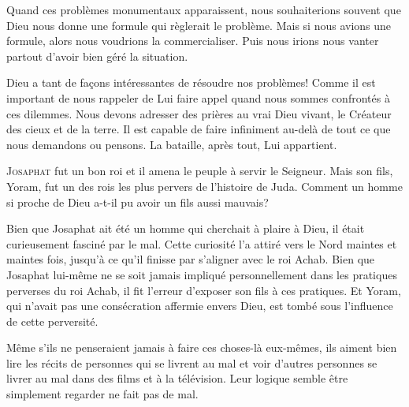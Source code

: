 Quand ces problèmes monumentaux apparaissent, nous souhaiterions souvent
 que Dieu nous donne une formule qui règlerait le problème.
 Mais si nous avions une formule, alors nous voudrions la commercialiser.
 Puis nous irions nous vanter partout d'avoir bien géré la situation. 

Dieu a tant de fa\c{c}ons intéressantes de résoudre nos problèmes!
 Comme il est important de nous rappeler de Lui faire appel quand nous sommes
 confrontés à ces dilemmes. Nous devons adresser des prières
 au vrai Dieu vivant, le Créateur des cieux et de la terre.
 Il est capable de faire infiniment au-delà de tout ce que nous demandons
 ou pensons. La bataille, après tout, Lui appartient. 

\dvrule






\lettrine{J}{osaphat} fut un bon roi et il amena le peuple
 à servir le Seigneur. Mais son fils, Yoram, fut un des rois
 les plus pervers de l'histoire de Juda.
 Comment un homme si proche de Dieu a-t-il pu avoir un fils
 aussi mauvais? 

Bien que Josaphat ait été un homme qui cherchait à plaire à Dieu,
 il était curieusement fasciné par le mal.
 Cette curiosité l'a attiré vers le Nord maintes et maintes fois,
 jusqu'à ce qu'il finisse par s'aligner avec le roi Achab.
 Bien que Josaphat lui-même ne se soit jamais impliqué personnellement
 dans les pratiques perverses du roi Achab, il fit l'erreur d'exposer
 son fils à ces pratiques. Et Yoram, qui n'avait pas une consécration
 affermie envers Dieu, est tombé sous l'influence de cette perversité. 


Même s'ils ne penseraient jamais à faire ces choses-là eux-mêmes,
 ils aiment bien lire les récits de personnes qui se livrent au mal
 et voir d'autres personnes se livrer au mal dans des films
 et à la télévision. Leur logique semble être
 \Og simplement regarder ne fait pas de mal. \Fg{}

